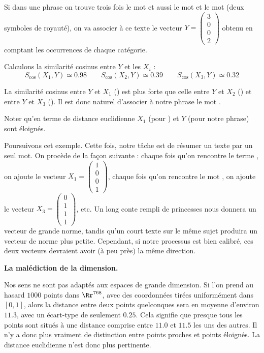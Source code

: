 \documentclass[11pt,class=report,crop=false]{standalone}
\begin{document}
\begin{exemple}
Si dans une phrase on trouve trois fois le mot  et aussi le mot  et le mot  (deux symboles de royauté), on va associer à ce texte le vecteur $Y = \left(\begin{smallmatrix}3\\0\\0\\2\end{smallmatrix}\right)$ obtenu en comptant les occurrences de chaque catégorie.

Calculons la similarité cosinus entre $Y$ et les $X_i$ :
$$
S_{\cos}(X_1,Y) \simeq 0.98 \qquad
S_{\cos}(X_2,Y) \simeq 0.39 \qquad
S_{\cos}(X_3,Y) \simeq 0.32 
$$

La similarité cosinus entre $Y$ et $X_1$ () est plus forte que celle entre $Y$ et $X_2$ () et entre $Y$ et  $X_3$ (). Il est donc naturel d'associer à notre phrase le mot .


Noter qu'en terme de distance euclidienne $X_1$ (pour ) et $Y$ (pour notre phrase) sont éloignés.
\end{exemple}


\begin{exemple}
Poursuivons cet exemple. Cette fois, notre tâche est de résumer un texte par un seul mot.
On procède de la façon suivante : chaque fois qu'on rencontre le terme , on ajoute le vecteur
$X_1 = \left(\begin{smallmatrix}1\\0\\0\\1\end{smallmatrix}\right)$,
chaque fois qu'on rencontre le mot , on ajoute le vecteur
$X_3 = \left(\begin{smallmatrix}0\\1\\1\\1\end{smallmatrix}\right)$, etc.
Un long conte rempli de princesses nous donnera un vecteur de grande norme, tandis qu’un court texte sur le même sujet produira un vecteur de norme plus petite.
Cependant, si notre processus est bien calibré, ces deux vecteurs devraient avoir (à peu près) la même direction.
\end{exemple}


\medskip

\textbf{La malédiction de la dimension.}  

Nos sens ne sont pas adaptés aux espaces de grande dimension. Si l’on prend au hasard $1000$ points dans $\Rr^{768}$, avec des coordonnées tirées uniformément dans $[0,1]$, alors la distance entre deux points quelconques sera en moyenne d’environ $11.3$, avec un écart-type de seulement $0.25$.  
Cela signifie que presque tous les points sont situés à une distance comprise entre $11.0$ et $11.5$ les uns des autres. Il n’y a donc plus vraiment de distinction entre points proches et points éloignés. La distance euclidienne n'est donc plus pertinente.
\end{document}

